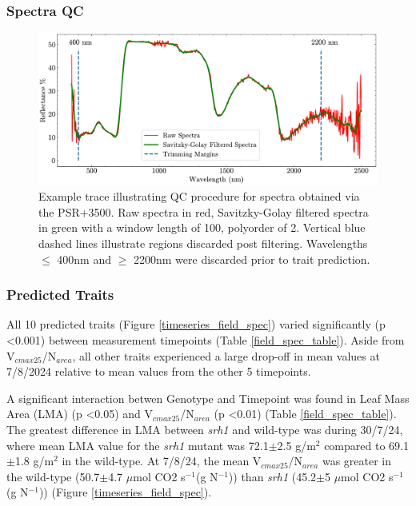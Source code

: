 \documentclass{article}
\begin{document}
\subsubsection{Spectra QC}

\begin{figure}[H]
	\centering
	\includegraphics[width=\textwidth]{psr_spectra_qc.pdf}
	\caption{Example trace illustrating QC procedure for spectra obtained via the PSR+3500. Raw spectra in red, Savitzky-Golay filtered spectra in green with a window length of 100, polyorder of 2. Vertical blue dashed lines illustrate regions discarded post filtering. Wavelengths $\leq$ 400nm and $\geq$ 2200nm were discarded prior to trait prediction. }
	\label{psr_spectra_qc}
\end{figure}










\subsubsection{Predicted Traits}
All 10 predicted traits (Figure \ref{timeseries_field_spec}) varied significantly
(p \textless 0.001) between measurement timepoints (Table \ref{field_spec_table}).
Aside from V$_{cmax25}$/N$_{area}$, all other traits experienced a large drop-off
in mean values at 7/8/2024 relative to mean values from the other 5 timepoints.

A significant interaction betwen Genotype and Timepoint was found in Leaf Mass
Area (LMA) (p \textless 0.05) and V$_{cmax25}$/N$_{area}$ (p \textless 0.01) (Table
\ref{field_spec_table}). The greatest difference in LMA between \textit{srh1}
and wild-type was during 30/7/24, where mean LMA value for the \textit{srh1}
mutant was 72.1$\pm$2.5 g/m$^{2}$ compared to 69.1$\pm$1.8 g/m$^{2}$ in the wild-type.
At 7/8/24, the mean V$_{cmax25}$/N$_{area}$ was greater in the wild-type (50.7$\pm$4.7
$\mu$mol CO2 s$^{-1}$(g N$^{-1}$)) than \textit{srh1} (45.2$\pm$5 $\mu$mol
CO2 s$^{-1}$(g N$^{-1}$)) (Figure \ref{timeseries_field_spec}).
\end{document}

